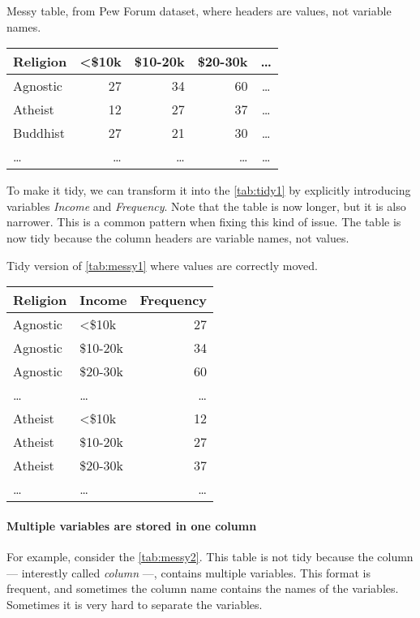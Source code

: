\begin{tablebox}[label=tab:messy1]{Messy table, from Pew Forum dataset, where headers are values, not variable names.}
  \centering
  \begin{tabular}{l r r r c}
    \toprule
    Religion & <\$10k & \$10-20k & \$20-30k & \dots \\
    \midrule
    Agnostic & 27 & 34 & 60 & \dots \\
    Atheist & 12 & 27 & 37 & \dots \\
    Buddhist & 27 & 21 & 30 & \dots \\
    \dots & \dots & \dots & \dots & \dots \\
    \bottomrule
  \end{tabular}
\end{tablebox}

To make it tidy, we can transform it into the \cref{tab:tidy1} by explicitly introducing
variables \emph{Income} and \emph{Frequency}.
Note that the table is now longer, but it is also narrower.  This is a common pattern when
fixing this kind of issue.  The table is now tidy because the column headers are variable
names, not values.

\begin{tablebox}[label=tab:tidy1]{Tidy version of \cref{tab:messy1} where values are correctly moved.}
  \centering
  \begin{tabular}{l l r}
    \toprule
    Religion & Income & Frequency \\
    \midrule
    Agnostic & <\$10k & 27 \\
    Agnostic & \$10-20k & 34 \\
    Agnostic & \$20-30k & 60 \\
    \dots & \dots & \dots \\
    Atheist & <\$10k & 12 \\
    Atheist & \$10-20k & 27 \\
    Atheist & \$20-30k & 37 \\
    \dots & \dots & \dots \\
    \bottomrule
  \end{tabular}
\end{tablebox}

\clearpage
\paragraph{Multiple variables are stored in one column}  For example, consider the
\cref{tab:messy2}.  This table is not tidy because the column --- interestly called
\emph{column} ---, contains multiple variables.  This format is frequent, and sometimes the
column name contains the names of the variables.  Sometimes it is very hard to separate
the variables.

